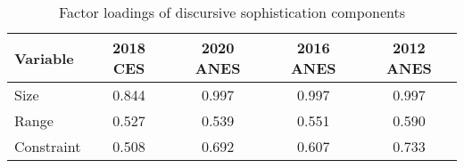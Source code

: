 \begin{table}[ht]
\centering
\begin{tabular}{lcccc}
  \hline
Variable & 2018 CES & 2020 ANES & 2016 ANES & 2012 ANES \\ 
  \hline
Size & 0.844 & 0.997 & 0.997 & 0.997 \\ 
  Range & 0.527 & 0.539 & 0.551 & 0.590 \\ 
  Constraint & 0.508 & 0.692 & 0.607 & 0.733 \\ 
   \hline
\end{tabular}
\caption{Factor loadings of discursive sophistication components} 
\label{tab:factload}
\end{table}
